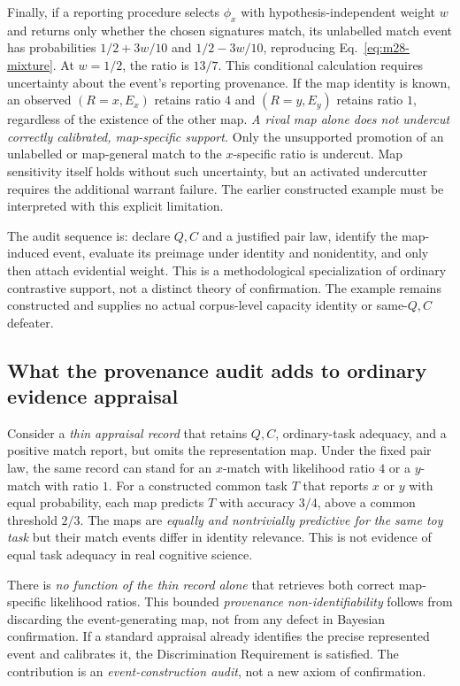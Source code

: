 \documentclass[11pt]{article}
\begin{document}
Finally, if a reporting procedure selects \(\phi_x\) with hypothesis-independent weight \(w\) and returns only whether the chosen signatures match, its unlabelled match event has probabilities \(1/2+3w/10\) and \(1/2-3w/10\), reproducing Eq.~\eqref{eq:m28-mixture}. At \(w=1/2\), the ratio is \(13/7\). This conditional calculation requires uncertainty about the event's reporting provenance. If the map identity is known, an observed \((R=x,E_x)\) retains ratio \(4\) and \((R=y,E_y)\) retains ratio \(1\), regardless of the existence of the other map. \emph{A rival map alone does not undercut correctly calibrated, map-specific support.} Only the unsupported promotion of an unlabelled or map-general match to the \(x\)-specific ratio is undercut. Map sensitivity itself holds without such uncertainty, but an activated undercutter requires the additional warrant failure. The earlier constructed example must be interpreted with this explicit limitation.

The audit sequence is: declare \(Q,C\) and a justified pair law, identify the map-induced event, evaluate its preimage under identity and nonidentity, and only then attach evidential weight. This is a methodological specialization of ordinary contrastive support, not a distinct theory of confirmation. The example remains constructed and supplies no actual corpus-level capacity identity or same-\(Q,C\) defeater.



\subsection{What the provenance audit adds to ordinary evidence appraisal}
\label{sec:provenance-identifiability}

Consider a \emph{thin appraisal record} that retains \(Q,C\), ordinary-task adequacy, and a positive match report, but omits the representation map. Under the fixed pair law, the same record can stand for an \(x\)-match with likelihood ratio \(4\) or a \(y\)-match with ratio \(1\). For a constructed common task \(T\) that reports \(x\) or \(y\) with equal probability, each map predicts \(T\) with accuracy \(3/4\), above a common threshold \(2/3\). The maps are \emph{equally and nontrivially predictive for the same toy task} but their match events differ in identity relevance. This is not evidence of equal task adequacy in real cognitive science.

There is \emph{no function of the thin record alone} that retrieves both correct map-specific likelihood ratios. This bounded \emph{provenance non-identifiability} follows from discarding the event-generating map, not from any defect in Bayesian confirmation. If a standard appraisal already identifies the precise represented event and calibrates it, the Discrimination Requirement is satisfied. The contribution is an \emph{event-construction audit}, not a new axiom of confirmation.
\end{document}
